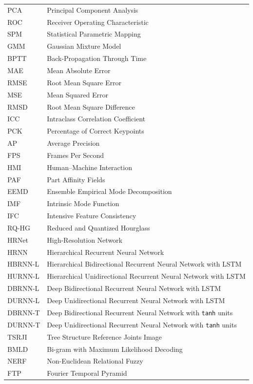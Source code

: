 \documentclass[12pt]{elsarticle}
\begin{document}
{\begin{longtable}{p{3cm} p{10.5cm}}
PCA & Principal Component Analysis \\
ROC & Receiver Operating Characteristic \\
SPM & Statistical Parametric Mapping \\
GMM & Gaussian Mixture Model \\
BPTT & Back-Propagation Through Time \\
MAE & Mean Absolute Error \\
RMSE & Root Mean Square Error \\
MSE & Mean Squared Error \\
RMSD & Root Mean Square Difference \\
ICC & Intraclass Correlation Coefficient \\
PCK & Percentage of Correct Keypoints \\
AP & Average Precision \\
FPS & Frames Per Second \\
HMI & Human--Machine Interaction \\
PAF & Part Affinity Fields \\
EEMD & Ensemble Empirical Mode Decomposition \\
IMF & Intrinsic Mode Function \\
IFC & Intensive Feature Consistency \\
RQ-HG & Reduced and Quantized Hourglass \\
HRNet & High-Resolution Network \\
HRNN & Hierarchical Recurrent Neural Network \\
HBRNN-L & Hierarchical Bidirectional Recurrent Neural Network with LSTM \\
HURNN-L & Hierarchical Unidirectional Recurrent Neural Network with LSTM \\
DBRNN-L & Deep Bidirectional Recurrent Neural Network with LSTM \\
DURNN-L & Deep Unidirectional Recurrent Neural Network with LSTM \\
DBRNN-T & Deep Bidirectional Recurrent Neural Network with \texttt{tanh} units \\
DURNN-T & Deep Unidirectional Recurrent Neural Network with \texttt{tanh} units \\
TSRJI & Tree Structure Reference Joints Image \\
BMLD & Bi-gram with Maximum Likelihood Decoding \\
NERF & Non-Euclidean Relational Fuzzy \\
FTP & Fourier Temporal Pyramid \\

\end{longtable}}
\end{document}
